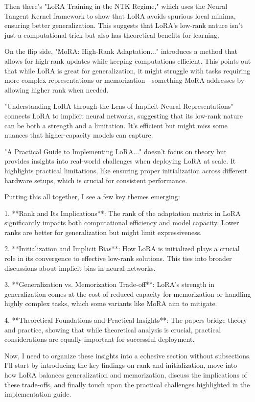 \documentclass[conference]{IEEEtran}
\begin{document}
Then there's "LoRA Training in the NTK Regime," which uses the Neural Tangent Kernel framework to show that LoRA avoids spurious local minima, ensuring better generalization. This suggests that LoRA's low-rank nature isn't just a computational trick but also has theoretical benefits for learning.

On the flip side, "MoRA: High-Rank Adaptation..." introduces a method that allows for high-rank updates while keeping computations efficient. This points out that while LoRA is great for generalization, it might struggle with tasks requiring more complex representations or memorization—something MoRA addresses by allowing higher rank when needed.

"Understanding LoRA through the Lens of Implicit Neural Representations" connects LoRA to implicit neural networks, suggesting that its low-rank nature can be both a strength and a limitation. It's efficient but might miss some nuances that higher-capacity models can capture.

"A Practical Guide to Implementing LoRA..." doesn't focus on theory but provides insights into real-world challenges when deploying LoRA at scale. It highlights practical limitations, like ensuring proper initialization across different hardware setups, which is crucial for consistent performance.

Putting this all together, I see a few key themes emerging:

1. **Rank and Its Implications**: The rank of the adaptation matrix in LoRA significantly impacts both computational efficiency and model capacity. Lower ranks are better for generalization but might limit expressiveness.

2. **Initialization and Implicit Bias**: How LoRA is initialized plays a crucial role in its convergence to effective low-rank solutions. This ties into broader discussions about implicit bias in neural networks.

3. **Generalization vs. Memorization Trade-off**: LoRA's strength in generalization comes at the cost of reduced capacity for memorization or handling highly complex tasks, which some variants like MoRA aim to mitigate.

4. **Theoretical Foundations and Practical Insights**: The papers bridge theory and practice, showing that while theoretical analysis is crucial, practical considerations are equally important for successful deployment.

Now, I need to organize these insights into a cohesive section without subsections. I'll start by introducing the key findings on rank and initialization, move into how LoRA balances generalization and memorization, discuss the implications of these trade-offs, and finally touch upon the practical challenges highlighted in the implementation guide.
\end{document}

